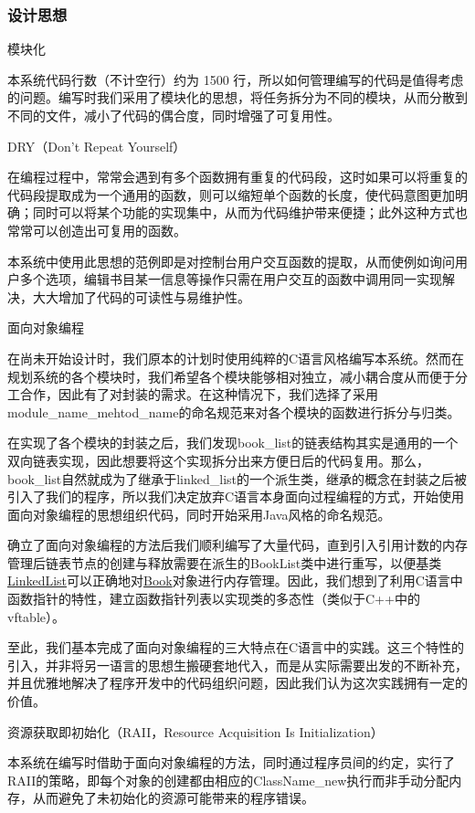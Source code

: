 \subsubsection*{设计思想}


\begin{DoxyEnumerate}
\item 模块化

本系统代码行数（不计空行）约为 1500 行，所以如何管理编写的代码是值得考虑的问题。编写时我们采用了模块化的思想，将任务拆分为不同的模块，从而分散到不同的文件，减小了代码的偶合度，同时增强了可复用性。
\item D\-R\-Y（\-Don't Repeat Yourself）

在编程过程中，常常会遇到有多个函数拥有重复的代码段，这时如果可以将重复的代码段提取成为一个通用的函数，则可以缩短单个函数的长度，使代码意图更加明确；同时可以将某个功能的实现集中，从而为代码维护带来便捷；此外这种方式也常常可以创造出可复用的函数。

本系统中使用此思想的范例即是对控制台用户交互函数的提取，从而使例如询问用户多个选项，编辑书目某一信息等操作只需在用户交互的函数中调用同一实现解决，大大增加了代码的可读性与易维护性。
\item 面向对象编程

在尚未开始设计时，我们原本的计划时使用纯粹的{\ttfamily C}语言风格编写本系统。然而在规划系统的各个模块时，我们希望各个模块能够相对独立，减小耦合度从而便于分工合作，因此有了对{\ttfamily 封装}的需求。在这种情况下，我们选择了采用{\ttfamily module\-\_\-name\-\_\-mehtod\-\_\-name}的命名规范来对各个模块的函数进行拆分与归类。

在实现了各个模块的{\ttfamily 封装}之后，我们发现{\ttfamily book\-\_\-list}的链表结构其实是通用的一个双向链表实现，因此想要将这个实现拆分出来方便日后的代码复用。那么，{\ttfamily book\-\_\-list}自然就成为了{\ttfamily 继承}于{\ttfamily linked\-\_\-list}的一个派生类，{\ttfamily 继承}的概念在{\ttfamily 封装}之后被引入了我们的程序，所以我们决定放弃{\ttfamily C}语言本身{\ttfamily 面向过程编程}的方式，开始使用{\ttfamily 面向对象编程}的思想组织代码，同时开始采用{\ttfamily Java}风格的命名规范。

确立了面向对象编程的方法后我们顺利编写了大量代码，直到引入{\ttfamily 引用计数}的内存管理后链表节点的创建与释放需要在派生的{\ttfamily Book\-List}类中进行{\ttfamily 重写}，以便基类{\ttfamily \hyperlink{structLinkedList}{Linked\-List}}可以正确地对{\ttfamily \hyperlink{structBook}{Book}}对象进行内存管理。因此，我们想到了利用{\ttfamily C}语言中函数指针的特性，建立函数指针列表以实现类的{\ttfamily 多态}性（类似于{\ttfamily C++}中的{\ttfamily vftable}）。

至此，我们基本完成了{\ttfamily 面向对象编程}的三大特点在{\ttfamily C}语言中的实践。这三个特性的引入，并非将另一语言的思想生搬硬套地代入，而是从实际需要出发的不断补充，并且优雅地解决了程序开发中的代码组织问题，因此我们认为这次实践拥有一定的价值。
\item 资源获取即初始化（\-R\-A\-I\-I，\-Resource Acquisition Is Initialization）

本系统在编写时借助于面向对象编程的方法，同时通过程序员间的约定，实行了{\ttfamily R\-A\-I\-I}的策略，即每个对象的创建都由相应的{\ttfamily Class\-Name\-\_\-new}执行而非手动分配内存，从而避免了未初始化的资源可能带来的程序错误。
\end{DoxyEnumerate}

